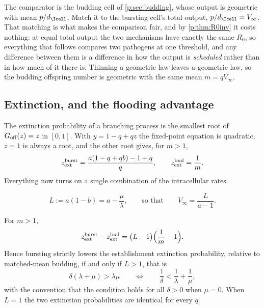 The comparator is the budding cell of \cref{p:sec:budding}, whose output is
geometric with mean $p/d_{\Icell}$. Match it to the bursting cell's total
output, $p/d_{\Icell}=V_\infty$. That matching is what makes the comparison
fair, and by \cref{p:thm:R0inv} it costs nothing: at equal total output the
two mechanisms have exactly the same $R_0$, so everything that follows
compares two pathogens at one threshold, and any difference between them is
a difference in how the output is \emph{scheduled} rather than in how much of
it there is. Thinning a geometric law leaves a geometric law, so the budding
offspring number is geometric with the same mean $m=qV_\infty$.

\subsection{Extinction, and the flooding advantage}

The extinction probability of a branching process is the smallest root of
$G_{\rm off}(z)=z$ in $[0,1]$. With $y=1-q+qz$ the fixed-point equation is
quadratic, $z=1$ is always a root, and the other root gives, for $m>1$,
\begin{equation}
z_{\rm ext}^{\rm burst}
=\frac{a(1-q+qb)-1+q}{q},
\qquad
z_{\rm ext}^{\rm bud}=\frac{1}{m}.
\label{p:eq:zext}
\end{equation}
Everything now turns on a single combination of the intracellular rates.

\begin{definition}
\label{p:def:L}
\begin{equation}
L:=a(1-b)=a-\frac{\mu}{\lambda},
\qquad\text{so that}\qquad
V_\infty=\frac{L}{a-1}.
\label{p:eq:Ldef}
\end{equation}
\end{definition}

\begin{theorem}
\label{p:thm:flood}
For $m>1$,
\begin{equation}
z_{\rm ext}^{\rm burst}-z_{\rm ext}^{\rm bud}
=\bigl(L-1\bigr)\Bigl(\frac{1}{m}-1\Bigr).
\label{p:eq:flood}
\end{equation}
Hence bursting strictly lowers the establishment extinction probability,
relative to matched-mean budding, if and only if $L>1$, that is
\begin{equation}
\delta(\lambda+\mu)>\lambda\mu
\qquad\Longleftrightarrow\qquad
\frac{1}{\delta}<\frac{1}{\lambda}+\frac{1}{\mu},
\label{p:eq:floodcrit}
\end{equation}
with the convention that the condition holds for all $\delta>0$ when
$\mu=0$. When $L=1$ the two extinction probabilities are identical for every
$q$.
\end{theorem}

